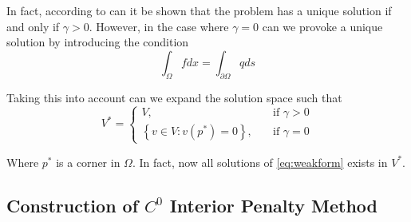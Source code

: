 
In fact, according to \cite{gu2012c0} can it be shown that the problem has a unique solution if and only if $\gamma >
0$. However, in the case where $\gamma  = 0$ can we provoke a unique solution by introducing the condition \[
\int_{\Omega }^{} f dx = \int_{\partial \Omega }^{}  q ds
\]

Taking this into account can we expand the solution space such that \[
V^* = \begin{cases}
    V, \quad & \text{if } \gamma >0 \\
    \left\{ v \in V: v\left( p^* \right) = 0 \right\}, \quad & \text{if } \gamma  =0
\end{cases}
\]

Where $p^{*}$  is a corner in $\Omega $. In fact, now all solutions of \eqref{eq:weakform} exists in $V^{*}$.


\subsection{Construction of $C^{0}$ Interior Penalty Method}%
\label{sub:construction_interior_penalty_method}


